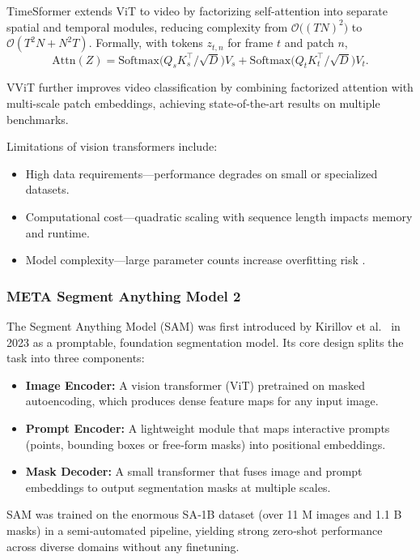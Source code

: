 TimeSformer \cite{bertasius_timesformer_2021} extends ViT to video by factorizing self-attention into separate spatial and temporal modules, reducing complexity from $\mathcal{O}\bigl((TN)^2\bigr)$ to $\mathcal{O}(T^2N + N^2T)$. Formally, with tokens $z_{t,n}$ for frame $t$ and patch $n$,
\[
\mathrm{Attn}(Z)
= \mathrm{Softmax}\!\bigl(Q_sK_s^\top/\sqrt{D}\bigr)V_s
+ \mathrm{Softmax}\!\bigl(Q_tK_t^\top/\sqrt{D}\bigr)V_t.
\]

VViT \cite{arnab_vvit_2021} further improves video classification by combining factorized attention with multi-scale patch embeddings, achieving state-of-the-art results on multiple benchmarks.


Limitations of vision transformers include:
\begin{itemize}

    \item High data requirements—performance degrades on small or specialized datasets.  
    \item Computational cost—quadratic scaling with sequence length impacts memory and runtime.  
    \item Model complexity—large parameter counts increase overfitting risk \cite{lee_enhancing_mamba_s6_2024}.
\end{itemize}



\subsubsection{META Segment Anything Model 2}
\label{ssec:meta_sam2}

The Segment Anything Model (SAM) was first introduced by Kirillov et al.\ \cite{kirillov_segment_2023} in 2023 as a promptable, foundation segmentation model.  Its core design splits the task into three components:
\begin{itemize}
    \item \textbf{Image Encoder:} A vision transformer (ViT) pretrained on masked autoencoding, which produces dense feature maps for any input image.
    \item \textbf{Prompt Encoder:} A lightweight module that maps interactive prompts (points, bounding boxes or free‐form masks) into positional embeddings.
    \item \textbf{Mask Decoder:} A small transformer that fuses image and prompt embeddings to output segmentation masks at multiple scales.
\end{itemize}
SAM was trained on the enormous SA‑1B dataset (over 11 M images and 1.1 B masks) in a semi‑automated pipeline, yielding strong zero‑shot performance across diverse domains without any finetuning.

